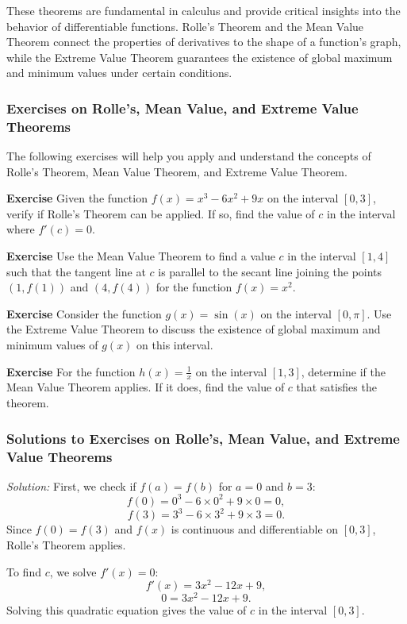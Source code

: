 \documentclass[a4paper,12pt]{book}
\newenvironment{exercise}[1][]
  {\par\medskip\noindent\textbf{Exercise #1} \rmfamily}
  {\medskip}
\newenvironment{solution}[1][]
{\par\noindent\textit{Solution:} \rmfamily}{\medskip}
\begin{document}
These theorems are fundamental in calculus and provide critical insights into the behavior of differentiable functions. Rolle's Theorem and the Mean Value Theorem connect the properties of derivatives to the shape of a function's graph, while the Extreme Value Theorem guarantees the existence of global maximum and minimum values under certain conditions.

\subsubsection*{Exercises on Rolle's, Mean Value, and Extreme Value Theorems}

The following exercises will help you apply and understand the concepts of Rolle's Theorem, Mean Value Theorem, and Extreme Value Theorem.

\begin{exercise}
Given the function \( f(x) = x^3 - 6x^2 + 9x \) on the interval \([0, 3]\), verify if Rolle's Theorem can be applied. If so, find the value of \( c \) in the interval where \( f'(c) = 0 \).
\end{exercise}

\begin{exercise}
Use the Mean Value Theorem to find a value \( c \) in the interval \([1, 4]\) such that the tangent line at \( c \) is parallel to the secant line joining the points \((1, f(1))\) and \((4, f(4))\) for the function \( f(x) = x^2 \).
\end{exercise}

\begin{exercise}
Consider the function \( g(x) = \sin(x) \) on the interval \([0, \pi]\). Use the Extreme Value Theorem to discuss the existence of global maximum and minimum values of \( g(x) \) on this interval.
\end{exercise}

\begin{exercise}
For the function \( h(x) = \frac{1}{x} \) on the interval \([1, 3]\), determine if the Mean Value Theorem applies. If it does, find the value of \( c \) that satisfies the theorem.
\end{exercise}

\subsubsection*{Solutions to Exercises on Rolle's, Mean Value, and Extreme Value Theorems}

\begin{solution}[to Exercise 1]
First, we check if \( f(a) = f(b) \) for \( a = 0 \) and \( b = 3 \):
\[ f(0) = 0^3 - 6 \times 0^2 + 9 \times 0 = 0, \]
\[ f(3) = 3^3 - 6 \times 3^2 + 9 \times 3 = 0. \]
Since \( f(0) = f(3) \) and \( f(x) \) is continuous and differentiable on \([0, 3]\), Rolle's Theorem applies. 

To find \( c \), we solve \( f'(x) = 0 \):
\[ f'(x) = 3x^2 - 12x + 9, \]
\[ 0 = 3x^2 - 12x + 9. \]
Solving this quadratic equation gives the value of \( c \) in the interval \([0, 3]\).
\end{solution}
\end{document}
